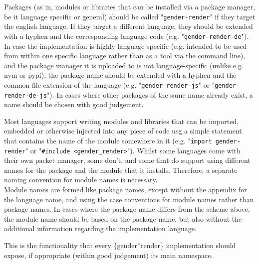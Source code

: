\documentclass{article}
\newcounter{subsubsubsection}[subsubsection]
\begin{document}
    Packages (as in, modules or libraries that can be installed via a package manager, be it language specific or general) should be called "\texttt{gender-render}" if they target the english language.
    If they target a different language, they should be extended with a hyphen and the corresponding language code (e.g. "\texttt{gender-render-de}").
    In case the implementation is highly language specific (e.g. intended to be used from within one specific language rather than as a tool via the command line), and the package manager it is uploaded to is not language-specific (unlike e.g. nvm or pypi), the package name should be extended with a hyphen and the common file extension of the language (e.g. "\texttt{gender-render-js}" or "\texttt{gender-render-de-js}").
    In cases where other packages of the same name already exist, a name should be chosen with good judgement.


    Most languages support writing modules and libraries that can be imported, embedded or otherwise injected into any piece of code usg a simple statement that contains the name of the module somewhere in it (e.g. "\texttt{import gender-render}" or "\texttt{\#include <gender\_render>}").
    Whilst some languages come with their own packet manager, some don't, and some that do support using different names for the package and the module that it installs.
    Therefore, a separate naming convention for module names is necessary.\\

    Module names are formed like package names, except without the appendix for the language name, and using the case conventions for module names rather than package names.
    In cases where the package name differs from the scheme above, the module name should be based on the package name, but also without the additional information regarding the implementation language.


    This is the functionality that every \{gender*render\} implementation should expose, if appropriate (within good judgement) its main namespace.\\
\end{document}
